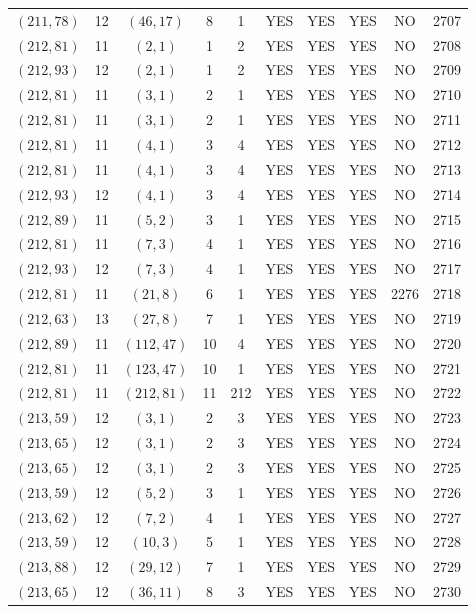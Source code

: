 \begin{longtable}{|c|c|c|c|c|c|c|c|c|c|}
$(211, 78)$ & 12 & $(46, 17)$ & 8 & 1 & YES & YES & YES & NO & 2707\\
$(212, 81)$ & 11 & $(2, 1)$ & 1 & 2 & YES & YES & YES & NO & 2708\\
$(212, 93)$ & 12 & $(2, 1)$ & 1 & 2 & YES & YES & YES & NO & 2709\\
$(212, 81)$ & 11 & $(3, 1)$ & 2 & 1 & YES & YES & YES & NO & 2710\\
$(212, 81)$ & 11 & $(3, 1)$ & 2 & 1 & YES & YES & YES & NO & 2711\\
$(212, 81)$ & 11 & $(4, 1)$ & 3 & 4 & YES & YES & YES & NO & 2712\\
$(212, 81)$ & 11 & $(4, 1)$ & 3 & 4 & YES & YES & YES & NO & 2713\\
$(212, 93)$ & 12 & $(4, 1)$ & 3 & 4 & YES & YES & YES & NO & 2714\\
$(212, 89)$ & 11 & $(5, 2)$ & 3 & 1 & YES & YES & YES & NO & 2715\\
$(212, 81)$ & 11 & $(7, 3)$ & 4 & 1 & YES & YES & YES & NO & 2716\\
$(212, 93)$ & 12 & $(7, 3)$ & 4 & 1 & YES & YES & YES & NO & 2717\\
$(212, 81)$ & 11 & $(21, 8)$ & 6 & 1 & YES & YES & YES & 2276 & 2718\\
$(212, 63)$ & 13 & $(27, 8)$ & 7 & 1 & YES & YES & YES & NO & 2719\\
$(212, 89)$ & 11 & $(112, 47)$ & 10 & 4 & YES & YES & YES & NO & 2720\\
$(212, 81)$ & 11 & $(123, 47)$ & 10 & 1 & YES & YES & YES & NO & 2721\\
$(212, 81)$ & 11 & $(212, 81)$ & 11 & 212 & YES & YES & YES & NO & 2722\\
$(213, 59)$ & 12 & $(3, 1)$ & 2 & 3 & YES & YES & YES & NO & 2723\\
$(213, 65)$ & 12 & $(3, 1)$ & 2 & 3 & YES & YES & YES & NO & 2724\\
$(213, 65)$ & 12 & $(3, 1)$ & 2 & 3 & YES & YES & YES & NO & 2725\\
$(213, 59)$ & 12 & $(5, 2)$ & 3 & 1 & YES & YES & YES & NO & 2726\\
$(213, 62)$ & 12 & $(7, 2)$ & 4 & 1 & YES & YES & YES & NO & 2727\\
$(213, 59)$ & 12 & $(10, 3)$ & 5 & 1 & YES & YES & YES & NO & 2728\\
$(213, 88)$ & 12 & $(29, 12)$ & 7 & 1 & YES & YES & YES & NO & 2729\\
$(213, 65)$ & 12 & $(36, 11)$ & 8 & 3 & YES & YES & YES & NO & 2730\\

\end{longtable}
